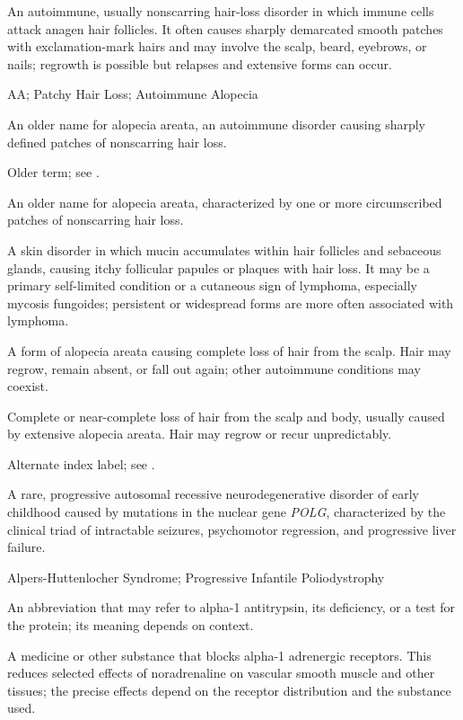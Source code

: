  An autoimmune, usually nonscarring hair-loss disorder in which immune cells attack anagen hair follicles. It often causes sharply demarcated smooth patches with exclamation-mark hairs and may involve the scalp, beard, eyebrows, or nails; regrowth is possible but relapses and extensive forms can occur.

\synonyms
AA; Patchy Hair Loss; Autoimmune Alopecia

 An older name for alopecia areata, an autoimmune disorder causing sharply defined patches of nonscarring hair loss.

 Older term; see .

 An older name for alopecia areata, characterized by one or more circumscribed patches of nonscarring hair loss.

 A skin disorder in which mucin accumulates within hair follicles and sebaceous glands, causing itchy follicular papules or plaques with hair loss. It may be a primary self-limited condition or a cutaneous sign of lymphoma, especially mycosis fungoides; persistent or widespread forms are more often associated with lymphoma.

 A form of alopecia areata causing complete loss of hair from the scalp. Hair may regrow, remain absent, or fall out again; other autoimmune conditions may coexist.

 Complete or near-complete loss of hair from the scalp and body, usually caused by extensive alopecia areata. Hair may regrow or recur unpredictably.

 Alternate index label; see .

 A rare, progressive autosomal recessive neurodegenerative disorder of early childhood caused by mutations in the nuclear gene \textit{POLG}, characterized by the clinical triad of intractable seizures, psychomotor regression, and progressive liver failure.

\synonyms
Alpers-Huttenlocher Syndrome; Progressive Infantile Poliodystrophy

 An abbreviation that may refer to alpha-1 antitrypsin, its
deficiency, or a test for the protein; its meaning depends on context.

 A medicine or other substance that blocks alpha-1 adrenergic receptors. This reduces selected effects of noradrenaline on vascular smooth muscle and other tissues; the precise effects depend on the receptor distribution and the substance used.

